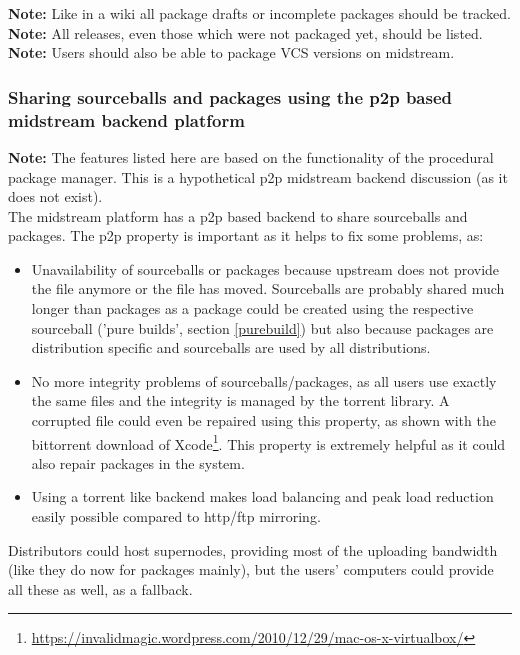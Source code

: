 \documentclass[a4paper,10pt]{article}
\begin{document}
\textbf{Note:} Like in a wiki all package drafts or incomplete packages should be tracked.\\

\textbf{Note:} All releases, even those which were not packaged yet, should be listed.\\

\textbf{Note:} Users should also be able to package VCS versions on midstream.







\newpage
\subsubsection{Sharing sourceballs and packages using the p2p based midstream backend platform} 
\label{sharingsourceballsp2p}
\textbf{Note:} The features listed here are based on the functionality of the procedural package manager. This is a hypothetical p2p midstream backend discussion (as it does not exist). \\

The midstream platform has a p2p based backend to share sourceballs and packages. The p2p property is important as it helps to fix some problems, as:
\begin{itemize}
\item Unavailability of sourceballs or packages because upstream does not provide the file anymore or the file has moved. Sourceballs are probably shared much longer than packages as a package could be created using the respective sourceball ('pure builds', section \ref{purebuild}) but also because packages are distribution specific and sourceballs are used by all distributions.
\item No more integrity problems of sourceballs/packages, as all users use exactly the same files and the integrity is managed by the torrent library. A corrupted file could even be repaired using this property, as shown with the bittorrent download of Xcode\footnote{\url{https://invalidmagic.wordpress.com/2010/12/29/mac-os-x-virtualbox/}}. This property is extremely helpful as it could also repair packages in the system.
\item Using a torrent like backend makes load balancing and peak load reduction easily possible compared to http/ftp mirroring.

\end{itemize}
Distributors could host supernodes, providing most of the uploading bandwidth (like they do now for packages mainly), but the users' computers could provide all these as well, as a fallback.
\end{document}
